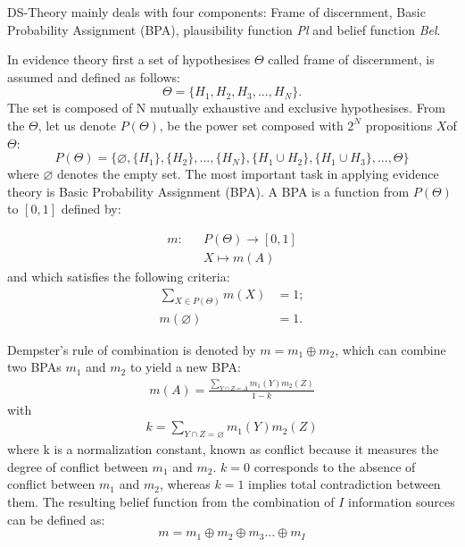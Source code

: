 \documentclass{ws-ijufks}
\begin{document}
DS-Theory mainly deals with four components: Frame of discernment, Basic Probability 
Assignment (BPA), plausibility function \emph{Pl} and belief function \emph{Bel}. 

In evidence theory first a set of hypothesises $\Theta$ called frame of discernment, is assumed and defined as follows:
\begin{equation}
\Theta=\{H_1,H_2,H_3,...,H_N\}.
\end{equation} 
The set is composed of N mutually exhaustive and exclusive hypothesises. From the $\Theta$, let us denote $P(\Theta)$, 
be the power set composed with $2^N$ propositions $X$of $\Theta$:
\begin{equation}
P(\Theta)=\{\varnothing, \{H_1\}, \{H_2\},..., \{H_N\},\{H_1\cup H_2\}, \{H_1\cup H_3\},...,\Theta \}
\end{equation}  
where $\varnothing$ denotes the empty set. The most important task in applying evidence theory is Basic Probability 
Assignment (BPA). A BPA is a function from $P(\Theta)$ to $[0, 1]$ defined by:

\begin{equation}
\begin{aligned}
m:&  &P(\Theta)\rightarrow [0,1]\\
&  &X\mapsto m(A)
\end{aligned}
\end{equation}
and which satisfies the following criteria:
\begin{equation}
\begin{aligned}
\sum\limits_{X\in{P(\Theta)}}m(X)&=1;\\
m(\varnothing)&=1.
\end {aligned}
\end{equation}

Dempster's rule of combination is denoted by $m=m_1\oplus m_2$, which can combine two 
BPAs $m_1$ and $m_2$ to yield a new BPA:
\begin{equation}
\begin{aligned}
m(A)=\frac{\sum\limits_{Y\cap Z=A}m_1(Y)m_2(Z)}{1-k}
\end{aligned}
\end{equation}
with
\begin{equation}
\begin{aligned}
k=\sum\limits_{Y\cap Z=\varnothing}m_1(Y)m_2(Z)
\end{aligned}
\end{equation}
where k is a normalization constant, known as conflict because it measures the degree of 
conflict between $m_1$ and $m_2$. $k=0$ corresponds to the absence of conflict between 
$m_1$ and $m_2$, whereas $k=1$ implies total contradiction between them. The resulting 
belief function from the combination of $I$ information sources can be defined as:
\begin{equation}
m=m_1\oplus m_2 \oplus m_3 ... \oplus m_I
\end{equation} 
\end{document}
